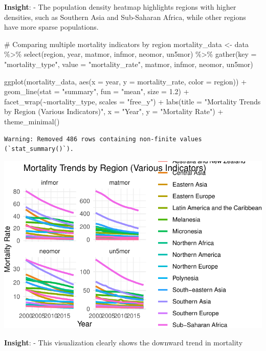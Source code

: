 \documentclass[
  letterpaper,
  DIV=11,
  numbers=noendperiod]{scrartcl}
\newenvironment{Shaded}{\begin{snugshade}}{\end{snugshade}}
\newcommand{\AttributeTok}[1]{\textcolor[rgb]{0.40,0.45,0.13}{#1}}
\newcommand{\CommentTok}[1]{\textcolor[rgb]{0.37,0.37,0.37}{#1}}
\newcommand{\FloatTok}[1]{\textcolor[rgb]{0.68,0.00,0.00}{#1}}
\newcommand{\FunctionTok}[1]{\textcolor[rgb]{0.28,0.35,0.67}{#1}}
\newcommand{\NormalTok}[1]{\textcolor[rgb]{0.00,0.23,0.31}{#1}}
\newcommand{\OtherTok}[1]{\textcolor[rgb]{0.00,0.23,0.31}{#1}}
\newcommand{\SpecialCharTok}[1]{\textcolor[rgb]{0.37,0.37,0.37}{#1}}
\newcommand{\StringTok}[1]{\textcolor[rgb]{0.13,0.47,0.30}{#1}}
\begin{document}
\textbf{Insight}: - The population density heatmap highlights regions
with higher densities, such as Southern Asia and Sub-Saharan Africa,
while other regions have more sparse populations.

\begin{Shaded}
\begin{Highlighting}[]
\CommentTok{\# Comparing multiple mortality indicators by region}
\NormalTok{mortality\_data }\OtherTok{\textless{}{-}}\NormalTok{ data }\SpecialCharTok{\%\textgreater{}\%} 
  \FunctionTok{select}\NormalTok{(region, year, matmor, infmor, neomor, un5mor) }\SpecialCharTok{\%\textgreater{}\%}
  \FunctionTok{gather}\NormalTok{(}\AttributeTok{key =} \StringTok{"mortality\_type"}\NormalTok{, }\AttributeTok{value =} \StringTok{"mortality\_rate"}\NormalTok{, matmor, infmor, neomor, un5mor)}

\FunctionTok{ggplot}\NormalTok{(mortality\_data, }\FunctionTok{aes}\NormalTok{(}\AttributeTok{x =}\NormalTok{ year, }\AttributeTok{y =}\NormalTok{ mortality\_rate, }\AttributeTok{color =}\NormalTok{ region)) }\SpecialCharTok{+}
  \FunctionTok{geom\_line}\NormalTok{(}\AttributeTok{stat =} \StringTok{"summary"}\NormalTok{, }\AttributeTok{fun =} \StringTok{"mean"}\NormalTok{, }\AttributeTok{size =} \FloatTok{1.2}\NormalTok{) }\SpecialCharTok{+}
  \FunctionTok{facet\_wrap}\NormalTok{(}\SpecialCharTok{\textasciitilde{}}\NormalTok{mortality\_type, }\AttributeTok{scales =} \StringTok{"free\_y"}\NormalTok{) }\SpecialCharTok{+}
  \FunctionTok{labs}\NormalTok{(}\AttributeTok{title =} \StringTok{"Mortality Trends by Region (Various Indicators)"}\NormalTok{, }\AttributeTok{x =} \StringTok{"Year"}\NormalTok{, }\AttributeTok{y =} \StringTok{"Mortality Rate"}\NormalTok{) }\SpecialCharTok{+}
  \FunctionTok{theme\_minimal}\NormalTok{()}
\end{Highlighting}
\end{Shaded}

\begin{verbatim}
Warning: Removed 486 rows containing non-finite values (`stat_summary()`).
\end{verbatim}

\includegraphics{EDA_files/figure-pdf/unnamed-chunk-15-1.pdf}

\textbf{Insight}: - This visualization clearly shows the downward trend
in mortality
\end{document}

